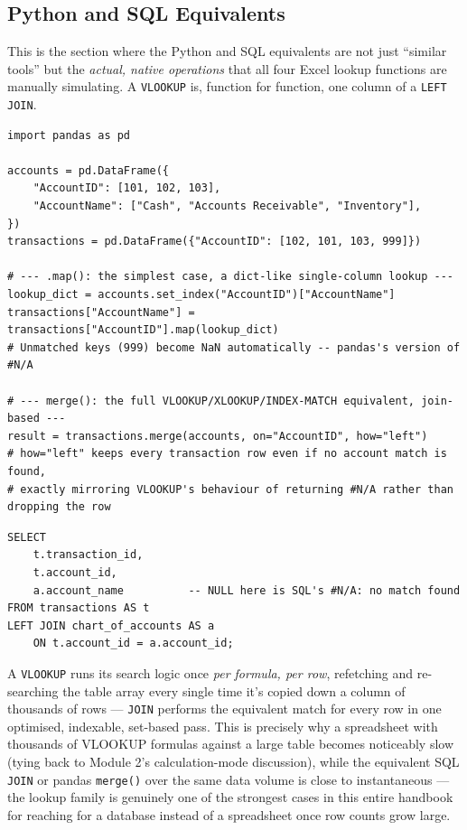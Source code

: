 \documentclass[11pt,a4paper]{article}
\begin{document}
\subsection{Python and SQL Equivalents}

\begin{keyconcept}
This is the section where the Python and SQL equivalents are not just ``similar tools'' but the \emph{actual, native operations} that all four Excel lookup functions are manually simulating. A \texttt{VLOOKUP} is, function for function, one column of a \texttt{LEFT JOIN}.
\end{keyconcept}

\begin{lstlisting}[style=pythonstyle, caption={pandas: .map() for a simple single-column lookup, merge() for the full VLOOKUP/INDEX-MATCH equivalent}]
import pandas as pd

accounts = pd.DataFrame({
    "AccountID": [101, 102, 103],
    "AccountName": ["Cash", "Accounts Receivable", "Inventory"],
})
transactions = pd.DataFrame({"AccountID": [102, 101, 103, 999]})

# --- .map(): the simplest case, a dict-like single-column lookup ---
lookup_dict = accounts.set_index("AccountID")["AccountName"]
transactions["AccountName"] = transactions["AccountID"].map(lookup_dict)
# Unmatched keys (999) become NaN automatically -- pandas's version of #N/A

# --- merge(): the full VLOOKUP/XLOOKUP/INDEX-MATCH equivalent, join-based ---
result = transactions.merge(accounts, on="AccountID", how="left")
# how="left" keeps every transaction row even if no account match is found,
# exactly mirroring VLOOKUP's behaviour of returning #N/A rather than dropping the row
\end{lstlisting}

\begin{lstlisting}[style=sqlstyle, caption={LEFT JOIN: the native, set-based version of every lookup function above, in one pass over the whole table}]
SELECT
    t.transaction_id,
    t.account_id,
    a.account_name          -- NULL here is SQL's #N/A: no match found
FROM transactions AS t
LEFT JOIN chart_of_accounts AS a
    ON t.account_id = a.account_id;
\end{lstlisting}

\begin{protip}
A \texttt{VLOOKUP} runs its search logic once \emph{per formula, per row}, refetching and re-searching the table array every single time it's copied down a column of thousands of rows --- \texttt{JOIN} performs the equivalent match for every row in one optimised, indexable, set-based pass. This is precisely why a spreadsheet with thousands of VLOOKUP formulas against a large table becomes noticeably slow (tying back to Module 2's calculation-mode discussion), while the equivalent SQL \texttt{JOIN} or pandas \texttt{merge()} over the same data volume is close to instantaneous --- the lookup family is genuinely one of the strongest cases in this entire handbook for reaching for a database instead of a spreadsheet once row counts grow large.
\end{protip}
\end{document}
